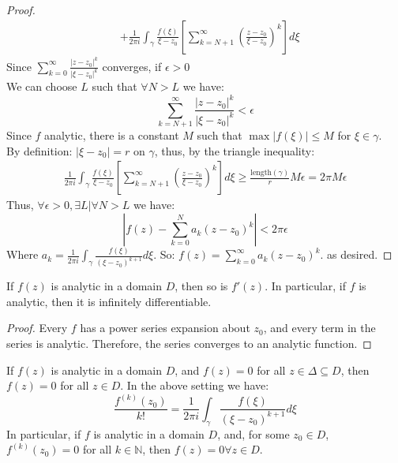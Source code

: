 \begin{proof}
\begin{align*}
             & + \frac{1}{2\pi i} \int_{\gamma} \frac{f(\xi)}{\xi - z_0} \left[ \sum_{k=N+1}^{\infty} \left(\frac{z - z_0}{\xi - z_0}\right)^k \right] d\xi
    \end{align*}
    Since $\sum_{k=0}^{\infty} \frac{|z - z_0|^k}{|\xi - z_0|^k}$ converges, if $\epsilon > 0$\\
    We can choose $L$ such that $\forall N > L$ we have:
    \begin{equation}
        \sum_{k=N+1}^{\infty} \frac{|z - z_0|^k}{|\xi - z_0|^k} < \epsilon
    \end{equation}
    Since $f$ analytic, there is a constant $M$ such that $\max|f(\xi)| \leq M$ for $\xi \in \gamma$.\\
    By definition: $|\xi - z_0| = r$ on $\gamma$, thus, by the triangle inequality:
    \begin{align*}
        \frac{1}{2\pi i} \int_{\gamma} \frac{f(\xi)}{\xi - z_0} \left[ \sum_{k=N+1}^{\infty} \left(\frac{z - z_0}{\xi - z_0}\right)^k \right] d\xi \geq \frac{\text{length}(\gamma)}{r} M \epsilon = 2\pi M \epsilon
    \end{align*}
    Thus, $\forall \epsilon > 0, \exists L | \forall N > L$ we have:
    \begin{equation}
        \left| f(z) - \sum_{k=0}^{N} a_k(z - z_0)^k \right| < 2\pi \epsilon
    \end{equation}
    Where $a_k = \frac{1}{2\pi i} \int_{\gamma} \frac{f(\xi)}{(\xi - z_0)^{k+1}} d\xi$.
    So: $f(z) = \sum_{k=0}^{\infty} a_k(z - z_0)^k$. as desired.

\end{proof}
\begin{corollary}
    If $f(z)$ is analytic in a domain $D$, then so is $f'(z)$. In particular, if $f$ is analytic, then it is infinitely differentiable.
\end{corollary}

\begin{proof}
    Every $f$ has a power series expansion about $z_0$, and every term in the series is analytic. Therefore, the series converges to an analytic function.
\end{proof}

\begin{corollary}
     If $f(z)$ is analytic in a domain $D$, and $f(z) = 0$ for all $z \in \Delta \subseteq D$, then $f(z) = 0$ for all $z \in D$.
    In the above setting we have:
    \begin{equation}
        \frac{f^{(k)}(z_0)}{k!} = \frac{1}{2\pi i} \int_{\gamma} \frac{f(\xi)}{(\xi - z_0)^{k+1}} d\xi
    \end{equation}
    In particular, if $f$ is analytic in a domain $D$, and, for some $z_0 \in D$, $f^{(k)}(z_0) = 0$ for all $k \in \mathbb{N}$, then $f(z) = 0 \forall z \in D$.
\end{corollary}
